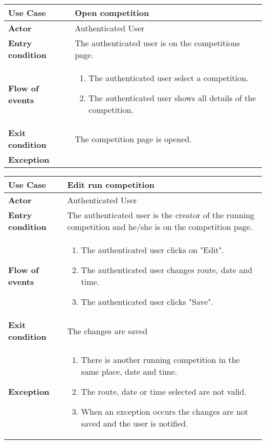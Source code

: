 \documentclass[../main.tex]{subfiles}
\begin{document}
	\vspace*{3cm}
	\begin{center}
		\begin{tabular}{p{3cm}p{8.28cm}}
			\hline
			\textbf{Use Case} & Open competition\\
			\hline
			\textbf{Actor} & Authenticated User\\
			\hline
			\textbf{Entry condition} & The authenticated user is on the competitions page.\\
			\hline
			\textbf{Flow of events} & \begin{enumerate}
				\linespread{0}\item The authenticated user select a competition.
				\linespread{0}\item The authenticated user shows all details of the competition.
			\end{enumerate}\\
			\hline
			\textbf{Exit condition} & The competition page is opened.\\
			\hline
			\textbf{Exception}\\
			\hline
		\end{tabular}
	\end{center}
	\vspace*{3cm}
	\begin{center}
		\begin{tabular}{p{3cm}p{8.28cm}}
			\hline
			\textbf{Use Case} & Edit run competition\\
			\hline
			\textbf{Actor} & Authenticated User\\
			\hline
			\textbf{Entry condition} & The authenticated user is the creator of the running competition and he/she is on the competition page.\\
			\hline
			\textbf{Flow of events} & \begin{enumerate}
				\linespread{0}\item The authenticated user clicks on "Edit".
				\linespread{0}\item The authenticated user changes route, date and time.
				\linespread{0}\item The authenticated user clicks "Save".
			\end{enumerate}\\
			\hline
			\textbf{Exit condition} & The changes are saved\\
			\hline
			\textbf{Exception}& \begin{enumerate}
				\linespread{0}\item There is another running competition in the same place, date and time.
				\linespread{0}\item The route, date or time selected are not valid.
				\linespread{0}\item When an exception occurs the changes are not saved and the user is notified.
			\end{enumerate}\\
			\hline
		\end{tabular}
	\end{center}
\end{document}
